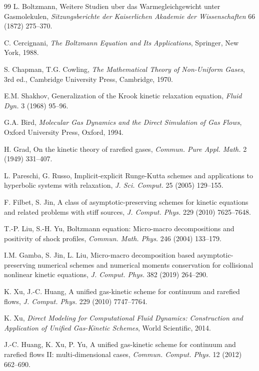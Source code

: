 \documentclass[preprint,12pt]{elsarticle}
\begin{document}
\begin{thebibliography}{99}
L. Boltzmann,
Weitere Studien uber das Warmegleichgewicht unter Gasmolekulen,
\textit{Sitzungsberichte der Kaiserlichen Akademie der Wissenschaften} 66 (1872) 275--370.

C. Cercignani,
\textit{The Boltzmann Equation and Its Applications},
Springer, New York, 1988.

S. Chapman, T.G. Cowling,
\textit{The Mathematical Theory of Non-Uniform Gases},
3rd ed., Cambridge University Press, Cambridge, 1970.

E.M. Shakhov,
Generalization of the Krook kinetic relaxation equation,
\textit{Fluid Dyn.} 3 (1968) 95--96.

G.A. Bird,
\textit{Molecular Gas Dynamics and the Direct Simulation of Gas Flows},
Oxford University Press, Oxford, 1994.

H. Grad,
On the kinetic theory of rarefied gases,
\textit{Commun. Pure Appl. Math.} 2 (1949) 331--407.

L. Pareschi, G. Russo,
Implicit-explicit Runge-Kutta schemes and applications to hyperbolic systems
with relaxation,
\textit{J. Sci. Comput.} 25 (2005) 129--155.

F. Filbet, S. Jin,
A class of asymptotic-preserving schemes for kinetic equations and related problems
with stiff sources,
\textit{J. Comput. Phys.} 229 (2010) 7625--7648.

T.-P. Liu, S.-H. Yu,
Boltzmann equation: Micro-macro decompositions and positivity of shock profiles,
\textit{Commun. Math. Phys.} 246 (2004) 133--179.

I.M. Gamba, S. Jin, L. Liu,
Micro-macro decomposition based asymptotic-preserving numerical schemes and
numerical moments conservation for collisional nonlinear kinetic equations,
\textit{J. Comput. Phys.} 382 (2019) 264--290.

K. Xu, J.-C. Huang,
A unified gas-kinetic scheme for continuum and rarefied flows,
\textit{J. Comput. Phys.} 229 (2010) 7747--7764.

K. Xu,
\textit{Direct Modeling for Computational Fluid Dynamics: Construction and Application of Unified Gas-Kinetic Schemes},
World Scientific, 2014.

J.-C. Huang, K. Xu, P. Yu,
A unified gas-kinetic scheme for continuum and rarefied flows II:
multi-dimensional cases,
\textit{Commun. Comput. Phys.} 12 (2012) 662--690.


\end{thebibliography}
\end{document}
